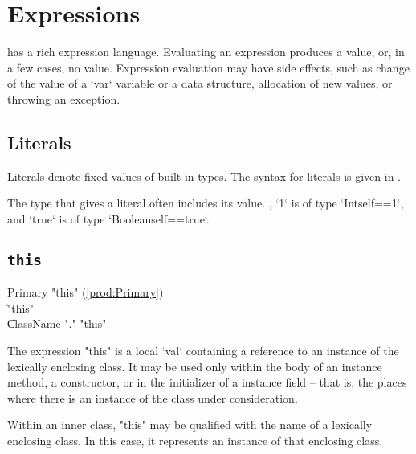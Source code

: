  \chapter{Expressions}\label{XtenExpressions}

\Xten{} has a rich expression language.
Evaluating an expression produces a value, or, in a few cases, no value. 
Expression evaluation may have side effects, such as change of the value of a 
\xcd`var` variable or a data structure, allocation of new values, or throwing
an exception. 



\section{Literals}

Literals denote fixed values of built-in types. 
The syntax for literals is given in . 

The type that \Xten{} gives a literal often includes its value. \Eg, \xcd`1`
is of type \xcd`Int{self==1}`, and \xcd`true` is of type
\xcd`Boolean{self==true}`.

\section{{\tt this}}

\begin{bbgrammar}
             Primary \: \xcd"this" (\ref{prod:Primary}) \\
                    \| \xcd"this" \\
                    \| ClassName \xcd"." \xcd"this" \\
\end{bbgrammar}


The expression \xcd"this" is a  local \xcd`val` containing a reference
to an instance of the lexically enclosing class.
It may be used only within the body of an instance method, a
constructor, or in the initializer of a instance field -- that is, the places
where there is an instance of the class under consideration.

Within an inner class, \xcd"this" may be qualified with the
name of a lexically enclosing class.  In this case, it
represents an instance of that enclosing class.  


